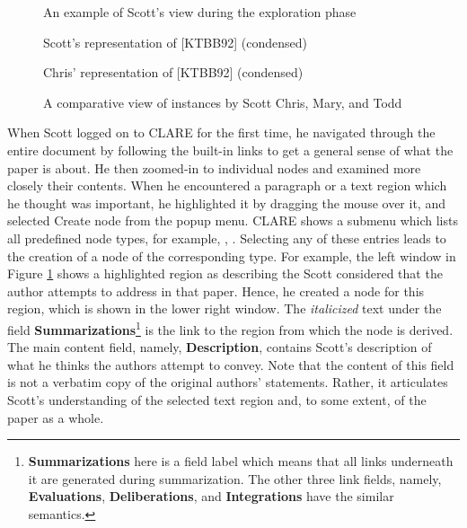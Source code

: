 \begin{figure}[htb]
  \centerline{}
  \caption{An example of Scott's view during the exploration phase}
  \label{fig:summarize}
\end{figure}

\begin{figure}[htb]
  \caption{Scott's representation of [KTBB92] (condensed)}
  \label{fig:cb1}
\end{figure}

\begin{figure}[htb]
  \caption{Chris' representation of [KTBB92] (condensed)}
  \label{fig:cb2}
\end{figure}

\begin{figure}[htb]
  \centerline{}
  \caption{A comparative view of  instances by Scott
  Chris, Mary, and Todd}
  \label{fig:compare}
\end{figure}

When Scott logged on to CLARE for the first time, he navigated through the
entire document by following the built-in links to get a general sense of
what the paper is about. He then zoomed-in to individual nodes and examined
more closely their contents. When he encountered a paragraph or a text
region which he thought was important, he highlighted it by dragging the
mouse over it, and selected {\sf Create node\/} from the popup menu. CLARE
shows a submenu which lists all predefined node types, for example,
, . Selecting any of these
entries leads to the creation of a node of the corresponding type.  For
example, the left window in Figure \ref{fig:summarize} shows a highlighted
region as describing the  Scott considered that the
author attempts to address in that paper.  Hence, he created a  node for this region, which is shown in the lower right
window. The {\it italicized\/} text under the field {\bf
Summarizations}\footnote{{\bf Summarizations} here is a field label which means
that all links underneath it are generated during summarization.  The other
three link fields, namely, {\bf Evaluations}, {\bf Deliberations\/}, and
{\bf Integrations\/} have the similar semantics.} is the link to the region
from which the node is derived. The main content field, namely, {\bf
Description}, contains Scott's description of what he thinks the authors
attempt to convey. Note that the content of this field is not a verbatim
copy of the original authors' statements. Rather, it articulates Scott's
understanding of the selected text region and, to some extent, of the paper
as a whole.

